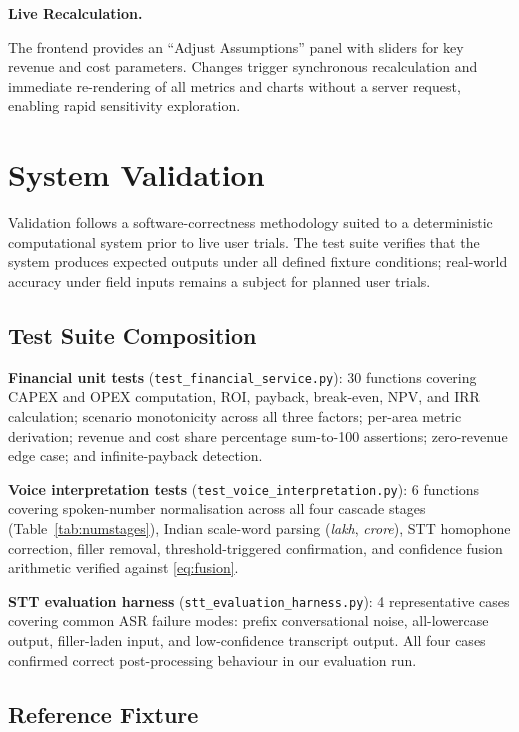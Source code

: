 \documentclass[conference]{IEEEtran}
\begin{document}
\medskip
\noindent\textbf{Live Recalculation.}

\noindent The frontend provides an ``Adjust Assumptions'' panel with
sliders for key revenue and cost parameters. Changes trigger synchronous
recalculation and immediate re-rendering of all metrics and charts
without a server request, enabling rapid sensitivity exploration.


\section{System Validation}
\label{sec:eval}

Validation follows a software-correctness methodology suited to a
deterministic computational system prior to live user trials. The test
suite verifies that the system produces expected outputs under all
defined fixture conditions; real-world accuracy under field inputs
remains a subject for planned user trials.

\subsection{Test Suite Composition}

\textbf{Financial unit tests} (\texttt{test\_financial\_service.py}):
30 functions covering CAPEX and OPEX computation, ROI, payback,
break-even, NPV, and IRR calculation; scenario monotonicity across
all three factors; per-area metric derivation; revenue and cost share
percentage sum-to-100 assertions; zero-revenue edge case; and
infinite-payback detection.

\textbf{Voice interpretation tests}
(\texttt{test\_voice\_interpretation.py}):
6 functions covering spoken-number normalisation across all four
cascade stages (Table~\ref{tab:numstages}), Indian scale-word parsing
(\emph{lakh}, \emph{crore}), STT homophone correction, filler removal,
threshold-triggered confirmation, and confidence fusion arithmetic
verified against \eqref{eq:fusion}.

\textbf{STT evaluation harness}
(\texttt{stt\_evaluation\_harness.py}):
4 representative cases covering common ASR failure modes: prefix
conversational noise, all-lowercase output, filler-laden input,
and low-confidence transcript output. All four cases confirmed
correct post-processing behaviour in our evaluation run.

\subsection{Reference Fixture}
\end{document}
